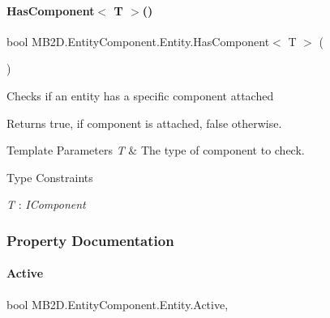 \paragraph{\texorpdfstring{Has\+Component$<$ T $>$()}{HasComponent< T >()}}
{\footnotesize\ttfamily bool M\+B2\+D.\+Entity\+Component.\+Entity.\+Has\+Component$<$ T $>$ (\begin{DoxyParamCaption}{ }\end{DoxyParamCaption})\hspace{0.3cm}{\ttfamily [inline]}}



Checks if an entity has a specific component attached 

\begin{DoxyReturn}{Returns}
{\ttfamily true}, if component is attached, {\ttfamily false} otherwise.
\end{DoxyReturn}

\begin{DoxyTemplParams}{Template Parameters}
{\em T} & The type of component to check.\\
\hline
\end{DoxyTemplParams}
\begin{Desc}
\item[Type Constraints]\begin{description}
\item[{\em T} : {\em I\+Component}]\end{description}
\end{Desc}


\subsubsection{Property Documentation}
\hypertarget{class_m_b2_d_1_1_entity_component_1_1_entity_a3860df1e77b87727abd227e9e713a97b}{}\label{class_m_b2_d_1_1_entity_component_1_1_entity_a3860df1e77b87727abd227e9e713a97b} 
\paragraph{\texorpdfstring{Active}{Active}}
{\footnotesize\ttfamily bool M\+B2\+D.\+Entity\+Component.\+Entity.\+Active\hspace{0.3cm}{\ttfamily [get]}, {\ttfamily [set]}}



